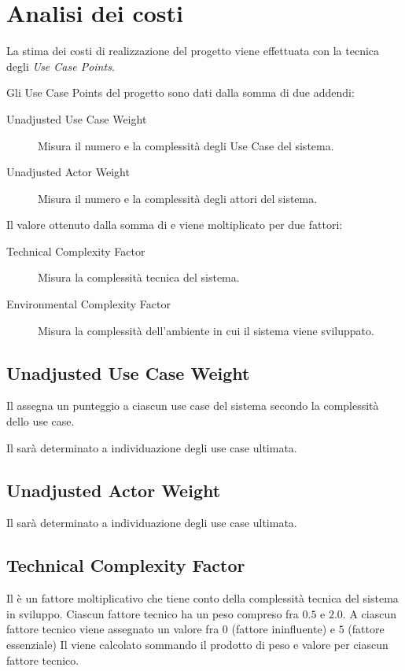 \section{Analisi dei costi}

La stima dei costi di realizzazione del progetto viene effettuata con la tecnica degli \emph{Use Case Points}.

Gli Use Case Points del progetto sono dati dalla somma di due addendi:
\begin{description}
	\item[Unadjusted Use Case Weight]
		Misura il numero e la complessit\`a degli Use Case del sistema.
	\item[Unadjusted Actor Weight]
		Misura il numero e la complessit\`a degli attori del sistema.
\end{description}
Il valore ottenuto dalla somma di  e  viene moltiplicato per due fattori:
\begin{description}
	\item[Technical Complexity Factor]
		Misura la complessit\`a tecnica del sistema.
	\item[Environmental Complexity Factor]
		Misura la complessit\`a dell'ambiente in cui il sistema viene sviluppato.
\end{description}

\subsection{Unadjusted Use Case Weight}

Il  assegna un punteggio a ciascun use case del sistema secondo la complessit\`a dello use case.

Il  sar\`a determinato a individuazione degli use case ultimata.

\subsection{Unadjusted Actor Weight}

Il  sar\`a determinato a individuazione degli use case ultimata.

\subsection{Technical Complexity Factor}

Il  \`e un fattore moltiplicativo che tiene conto della complessit\`a tecnica del sistema in sviluppo.
Ciascun fattore tecnico ha un peso compreso fra $0.5$ e $2.0$.
A ciascun fattore tecnico viene assegnato un valore fra $0$ (fattore ininfluente) e $5$ (fattore essenziale)
Il  viene calcolato sommando il prodotto di peso e valore per ciascun fattore tecnico.

